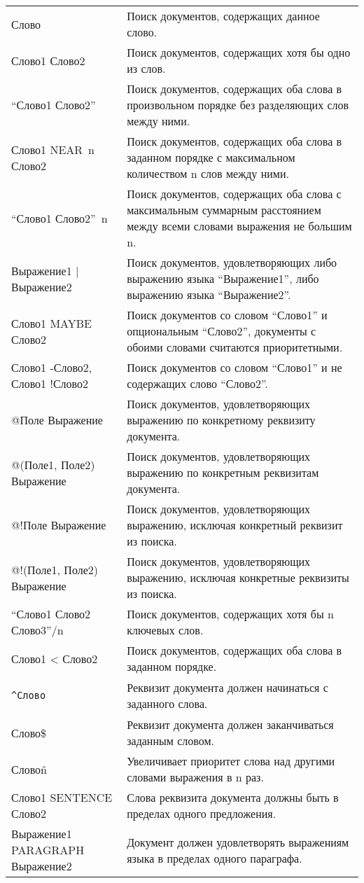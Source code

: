 \documentclass[russian,utf8,emptystyle]{eskdtext}
\begin{document}
\begin{center}
\begin{longtable}{L{6cm}|L{10cm}}
Слово & Поиск документов, содержащих данное слово. \\
Слово1 Слово2 & Поиск документов, содержащих хотя бы одно из слов. \\
“Слово1 Слово2” & Поиск документов, содержащих оба слова в произвольном порядке без разделяющих слов между ними. \\
Слово1 NEAR~n Слово2 & Поиск документов, содержащих оба слова в заданном порядке с максимальном количеством n слов между ними. \\
“Слово1 Слово2”~n & Поиск документов, содержащих оба слова с максимальным суммарным расстоянием между всеми словами выражения не большим n. \\
Выражение1 | Выражение2 & Поиск документов, удовлетворяющих либо выражению языка “Выражение1”, либо выражению языка “Выражение2”. \\
Слово1 MAYBE Слово2 & Поиск документов со словом “Слово1” и опциональным “Слово2”, документы с обоими словами считаются приоритетными. \\
Слово1 -Слово2, Слово1 !Слово2 & Поиск документов со словом “Слово1” и не содержащих слово “Слово2”. \\
@Поле Выражение & Поиск документов, удовлетворяющих выражению по конкретному реквизиту документа. \\
@(Поле1, Поле2) Выражение & Поиск документов, удовлетворяющих выражению по конкретным реквизитам документа. \\
@!Поле Выражение & Поиск документов, удовлетворяющих выражению, исключая конкретный реквизит из поиска. \\
@!(Поле1, Поле2) Выражение & Поиск документов, удовлетворяющих выражению, исключая конкретные реквизиты из поиска. \\
“Слово1 Слово2 Слово3”/n & Поиск документов, содержащих хотя бы n ключевых слов. \\
Слово1 <\< Слово2 & Поиск документов, содержащих оба слова в заданном порядке. \\
\begin{verbatim}^Слово\end{verbatim} & Реквизит документа должен начинаться с заданного слова. \\
Слово\$ & Реквизит документа должен заканчиваться заданным словом. \\
Слово\^n & Увеличивает приоритет слова над другими словами выражения в n раз. \\
Слово1 SENTENCE Слово2 & Слова реквизита документа должны быть в пределах одного предложения. \\
Выражение1 PARAGRAPH Выражение2 & Документ должен удовлетворять выражениям языка в пределах одного параграфа.\\

\end{longtable}
\end{center}
\end{document}
